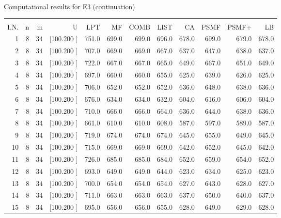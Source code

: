 \documentclass[12pt,a4paper]{article}
\begin{document}
\newpage
\begin{center}
 Computational results for E3 (continuation) {\tiny
\begin{tabular}{r r r r r r r r r r r r}\hline
    &   &   &          &        &        &        &        &        &        &        &       \\[-0.1in]
  I.N.  &  n  &  m  &  U  &  LPT  &  MF  &  COMB  &  LIST  &  CA  & PSMF &PSMF+ & LB \\[0.03in]
\hline
   1&  8& 34&[100.200   ]&   751.0&   699.0&   699.0&   696.0&   678.0&   699.0&   679.0&   678.0\\[-0.02in]
   2&  8& 34&[100.200   ]&   707.0&   669.0&   669.0&   667.0&   637.0&   647.0&   638.0&   637.0\\[-0.02in]
   3&  8& 34&[100.200   ]&   722.0&   667.0&   667.0&   665.0&   649.0&   667.0&   651.0&   649.0\\[-0.02in]
   4&  8& 34&[100.200   ]&   697.0&   660.0&   660.0&   655.0&   625.0&   639.0&   626.0&   625.0\\[-0.02in]
   5&  8& 34&[100.200   ]&   706.0&   652.0&   652.0&   652.0&   636.0&   648.0&   638.0&   636.0\\[-0.02in]
   6&  8& 34&[100.200   ]&   676.0&   634.0&   634.0&   632.0&   604.0&   616.0&   606.0&   604.0\\[-0.02in]
   7&  8& 34&[100.200   ]&   710.0&   666.0&   666.0&   664.0&   636.0&   644.0&   638.0&   636.0\\[-0.02in]
   8&  8& 34&[100.200   ]&   661.0&   610.0&   610.0&   608.0&   587.0&   597.0&   589.0&   587.0\\[-0.02in]
   9&  8& 34&[100.200   ]&   719.0&   674.0&   674.0&   674.0&   645.0&   655.0&   649.0&   645.0\\[-0.02in]
  10&  8& 34&[100.200   ]&   715.0&   669.0&   669.0&   669.0&   642.0&   652.0&   645.0&   642.0\\[-0.02in]
  11&  8& 34&[100.200   ]&   726.0&   685.0&   685.0&   684.0&   652.0&   659.0&   654.0&   652.0\\[-0.02in]
  12&  8& 34&[100.200   ]&   693.0&   649.0&   649.0&   644.0&   623.0&   634.0&   625.0&   623.0\\[-0.02in]
  13&  8& 34&[100.200   ]&   700.0&   654.0&   654.0&   654.0&   627.0&   643.0&   628.0&   627.0\\[-0.02in]
  14&  8& 34&[100.200   ]&   711.0&   663.0&   663.0&   663.0&   637.0&   650.0&   640.0&   637.0\\[-0.02in]
  15&  8& 34&[100.200   ]&   695.0&   656.0&   656.0&   655.0&   628.0&   649.0&   629.0&   628.0\\[-0.02in]

\end{tabular}}
\end{center}
\end{document}

